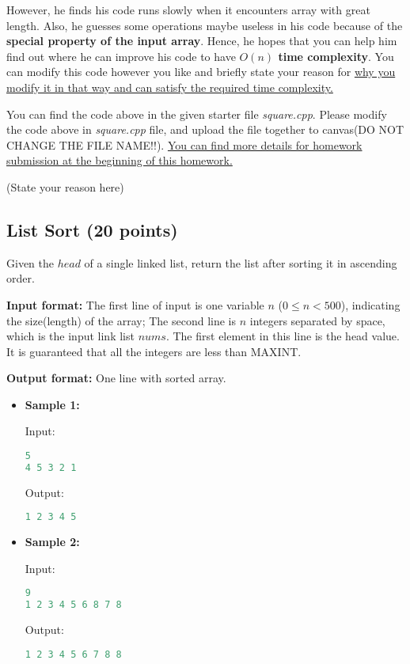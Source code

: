 \documentclass[11pt]{exam}
\begin{document}
However, he finds his code runs slowly when it encounters array with great length. Also, he guesses some operations maybe useless in his code because of the \textbf{special property of the input array}. Hence, he hopes that you can help him find out where he can improve his code to have \textbf{$O(n)$ time complexity}. You can modify this code however you like and briefly state your reason for \underline{why you modify it in that way and can satisfy the required time complexity.}

You can find the code above in the given starter file \textit{square.cpp}. Please modify the code above in \textit{square.cpp} file, and upload the file together to canvas(DO NOT CHANGE THE FILE NAME!!). \underline{You can find more details for homework submission at the beginning of this homework.}
\begin{solution}
(State your reason here)
\end{solution}

\subsection{List Sort (20 points)}

Given the $head$ of a single linked list, return the list after sorting it in ascending order.

\textbf{Input format:} The first line of input is one variable $n$ ($0 \leq n < 500$), indicating the size(length) of the array; The second line is $n$ integers separated by space, which is the input link list $nums$. The first element in this line is the head value. It is guaranteed that all the integers are less than MAXINT. 

\textbf{Output format:} One line with sorted array.

\begin{itemize}
\item \textbf{Sample 1:}

Input:
\begin{lstlisting}[language=c++]
5
4 5 3 2 1
\end{lstlisting}

Output:
\begin{lstlisting}[language=c++]
1 2 3 4 5
\end{lstlisting}


\item \textbf{Sample 2:}

Input:
\begin{lstlisting}[language=c++]
9
1 2 3 4 5 6 8 7 8
\end{lstlisting}

Output:
\begin{lstlisting}[language=c++]
1 2 3 4 5 6 7 8 8
\end{lstlisting}
\end{itemize}
\end{document}

